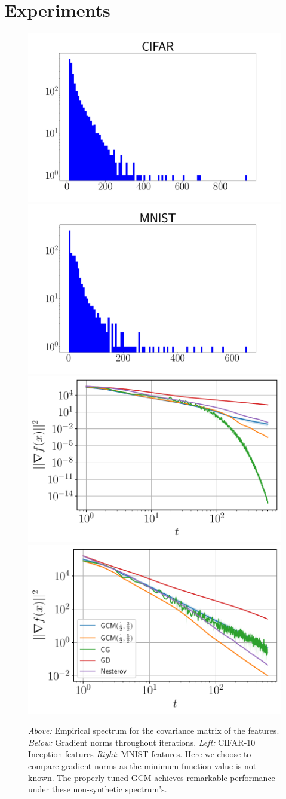 \documentclass{article}
\begin{document}
\section{Experiments}
\begin{figure}[t!]
    \centering
    \includegraphics[width=6 cm]{final_imgs/cifar_spectrum.pdf}\hspace{0.5 cm}\includegraphics[width= 6 cm]{final_imgs/mnist_spectrum.pdf}
    \includegraphics[width=6 cm]{final_imgs/cifar.pdf}\hspace{0.5 cm} \includegraphics[width= 6 cm]{final_imgs/mnist.pdf}
    \caption{\textit{Above:} Empirical spectrum for the covariance matrix of the features. \textit{Below:} Gradient norms throughout iterations. \textit{Left:} CIFAR-10 Inception features \textit{Right}: MNIST features. Here we choose to compare gradient norms as the minimum function value is not known. The properly tuned GCM achieves remarkable performance under these non-synthetic spectrum's.
}
    \label{fig: real data}
\end{figure}
\end{document}
